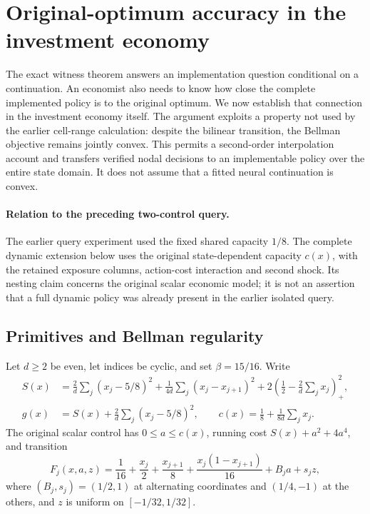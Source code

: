 \section{Original-optimum accuracy in the investment economy}\label{sec:accuracy62}
The exact witness theorem answers an implementation question conditional on a continuation. An economist also needs to know how close the complete implemented policy is to the original optimum. We now establish that connection in the investment economy itself. The argument exploits a property not used by the earlier cell-range calculation: despite the bilinear transition, the Bellman objective remains jointly convex. This permits a second-order interpolation account and transfers verified nodal decisions to an implementable policy over the entire state domain. It does not assume that a fitted neural continuation is convex.

\paragraph{Relation to the preceding two-control query.}
The earlier query experiment used the fixed shared capacity $1/8$. The complete dynamic extension below uses the original state-dependent capacity $c(x)$, with the retained exposure columns, action-cost interaction and second shock. Its nesting claim concerns the original scalar economic model; it is not an assertion that a full dynamic policy was already present in the earlier isolated query.

\subsection{Primitives and Bellman regularity}
Let $d\ge2$ be even, let indices be cyclic, and set $\beta=15/16$. Write
\begin{align*}
 S(x)&=\frac2d\sum_j(x_j-5/8)^2+
       \frac1{4d}\sum_j(x_j-x_{j+1})^2+
       2\left(\frac12-\frac2d\sum_jx_j\right)_+^2,\\
 g(x)&=S(x)+\frac2d\sum_j(x_j-5/8)^2,\qquad
 c(x)=\frac18+\frac1{8d}\sum_jx_j.
\end{align*}
The original scalar control has $0\le a\le c(x)$, running cost $S(x)+a^2+4a^4$, and transition
\[
 F_j(x,a,z)=\frac1{16}+\frac{x_j}{2}+\frac{x_{j+1}}8+
       \frac{x_j(1-x_{j+1})}{16}+B_ja+s_jz,
\]
where $(B_j,s_j)=(1/2,1)$ at alternating coordinates and $(1/4,-1)$ at the others, and $z$ is uniform on $[-1/32,1/32]$.

